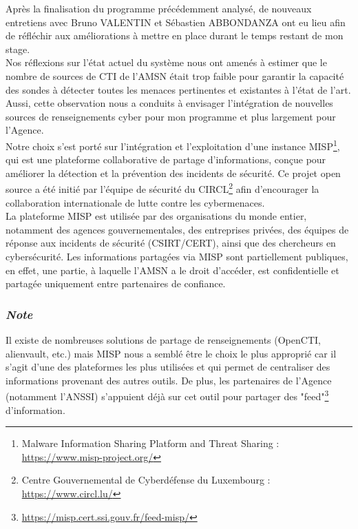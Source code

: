 \vspace{1em}

Après la finalisation du programme précédemment analysé, de nouveaux entretiens avec Bruno VALENTIN et Sébastien ABBONDANZA ont eu lieu afin de réfléchir aux améliorations à mettre en place durant le temps restant de mon stage.\\

Nos réflexions sur l'état actuel du système nous ont amenés à estimer que le nombre de sources de CTI de l'AMSN était trop faible pour garantir la capacité des sondes à détecter toutes les menaces pertinentes et existantes à l'état de l'art. Aussi, cette observation nous a conduits à envisager l'intégration de nouvelles sources de renseignements cyber pour mon programme et plus largement pour l'Agence.\\

Notre choix s'est porté sur l'intégration et l'exploitation d'une instance MISP\footnote{Malware Information Sharing Platform and Threat Sharing : \url{https://www.misp-project.org/}}, qui est une plateforme collaborative de partage d'informations, conçue pour améliorer la détection et la prévention des incidents de sécurité. Ce projet open source a été initié par l’équipe de sécurité du CIRCL\footnote{Centre Gouvernemental de Cyberdéfense du Luxembourg : \url{https://www.circl.lu/}} afin d'encourager la collaboration internationale de lutte contre les cybermenaces.\\

La plateforme MISP est utilisée par des organisations du monde entier, notamment des agences gouvernementales, des entreprises privées, des équipes de réponse aux incidents de sécurité (CSIRT/CERT), ainsi que des chercheurs en cybersécurité. Les informations partagées via MISP sont partiellement publiques, en effet, une partie, à laquelle l'AMSN a le droit d'accéder, est confidentielle et partagée uniquement entre partenaires de confiance.\\

\vspace{1em}

\subsubsection{\textit{Note}}
Il existe de nombreuses solutions de partage de renseignements (OpenCTI, alienvault, etc.) mais MISP nous a semblé être le choix le plus approprié car il s'agit d'une des plateformes les plus utilisées et qui permet de centraliser des informations provenant des autres outils. De plus, les partenaires de l'Agence (notamment l'ANSSI) s'appuient déjà sur cet outil pour partager des "feed"\footnote{\url{https://misp.cert.ssi.gouv.fr/feed-misp/}} d'information.

